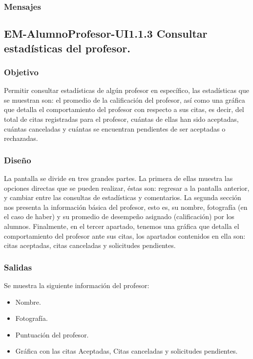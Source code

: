 \subsubsection{Mensajes}
\begin{Citemize}
	\item {}
	\item {}
\end{Citemize}


\subsection{EM-AlumnoProfesor-UI1.1.3 Consultar estadísticas del profesor.}

\subsubsection{Objetivo}
	\noindent
	Permitir consultar estadísticas de algún profesor en específico, las estadísticas que se muestran son: el promedio de la calificación del profesor, así como una gráfica que detalla el comportamiento del profesor con respecto a sus citas, es decir, del total de citas registradas para el profesor, cuántas de ellas han sido aceptadas, cuántas canceladas y cuántas se encuentran pendientes de ser aceptadas o rechazadas. 

\subsubsection{Diseño}
	\noindent
	La pantalla se divide en tres grandes partes. La primera de ellas muestra las opciones directas que se pueden realizar, éstas son: regresar a la pantalla anterior, y cambiar entre las consultas de estadísticas y comentarios. La segunda sección nos presenta la información básica del profesor, esto es, su nombre, fotografía (en el caso de haber) y su promedio de desempeño asignado (calificación) por los alumnos. Finalmente, en el tercer apartado, tenemos una gráfica que detalla el comportamiento del profesor ante sus citas, los apartados contenidos en ella son: citas aceptadas, citas canceladas y solicitudes pendientes. 

\pagebreak
{}

\subsubsection{Salidas}
	\noindent
	Se muestra la siguiente información del profesor:
	\begin{itemize} 
		\item Nombre.
		\item Fotografía.
		\item Puntuación del profesor.
		\item Gráfica con las citas Aceptadas, Citas canceladas y solicitudes pendientes.
	\end{itemize}

